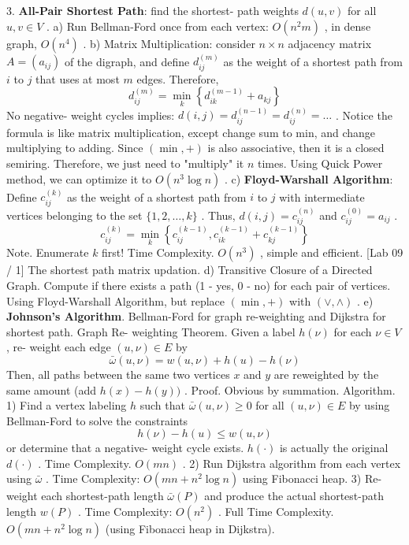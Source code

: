 \documentclass[10pt,a4paper]{article}
\begin{document}
3. \textbf{All-Pair Shortest Path}: find the shortest- path weights \(d(u,v)\) for all \(u,v\in V\) .
a) Run Bellman-Ford once from each vertex: \(O(n^{2}m)\) , in dense graph, \(O(n^{4})\) .
b) Matrix Multiplication: consider \(n\times n\) adjacency matrix \(A = (a_{ij})\) of the digraph, and define \(d_{ij}^{(m)}\) as the weight of a shortest path from \(i\) to \(j\) that uses at most \(m\) edges. Therefore,
\[
d_{ij}^{(m)} = \min_k\left\{d_{ik}^{(m - 1)} + a_{kj}\right\}
\]
No negative- weight cycles implies: \(d(i,j) = d_{ij}^{(n - 1)} = d_{ij}^{(n)} = \dots\) .
Notice the formula is like matrix multiplication, except change sum to min, and change multiplying to adding. Since \((\min, +)\) is also associative, then it is a closed semiring. Therefore, we just need to "multiply" it \(n\) times. Using Quick Power method, we can optimize it to \(O(n^{3}\log n)\) .
c) \textbf{Floyd-Warshall Algorithm}: Define \(c_{ij}^{(k)}\) as the weight of a shortest path from \(i\) to \(j\) with intermediate vertices belonging to the set \(\{1,2,\ldots ,k\}\) . Thus, \(d(i,j) = c_{ij}^{(n)}\) and \(c_{ij}^{(0)} = a_{ij}\) .
\[
c_{ij}^{(k)} = \min_k\left\{c_{ij}^{(k - 1)},c_{ik}^{(k - 1)} + c_{kj}^{(k - 1)}\right\}
\]
Note. Enumerate \(k\) first!
Time Complexity. \(O(n^3)\) , simple and efficient.
[Lab 09 / 1] The shortest path matrix updation.
d) Transitive Closure of a Directed Graph. Compute if there exists a path (1 - yes, 0 - no) for each pair of vertices. Using Floyd-Warshall Algorithm, but replace \((\min, +)\) with \((\lor, \land)\) .
e) \textbf{Johnson's Algorithm}. Bellman-Ford for graph re-weighting and Dijkstra for shortest path.
Graph Re- weighting Theorem. Given a label \(h(\nu)\) for each \(\nu \in V\) , re- weight each edge \((u,\nu)\in E\) by
\[
\bar{\omega} (u,\nu) = w(u,\nu) + h(u) - h(\nu)
\]
Then, all paths between the same two vertices \(x\) and \(y\) are reweighted by the same amount (add \(h(x) - h(y))\) .
Proof. Obvious by summation.
Algorithm.
1) Find a vertex labeling \(h\) such that \(\bar{\omega} (u,\nu)\geq 0\) for all \((u,\nu)\in E\) by using Bellman-Ford to solve the constraints
\[
h(\nu) - h(u)\leq w(u,\nu)
\]
or determine that a negative- weight cycle exists. \(h(\cdot)\) is actually the original \(d(\cdot)\) .
Time Complexity. \(O(mn)\) .
2) Run Dijkstra algorithm from each vertex using \(\bar{\omega}\) .
Time Complexity: \(O(mn + n^2\log n)\) using Fibonacci heap.
3) Re-weight each shortest-path length \(\bar{\omega} (P)\) and produce the actual shortest-path length \(w(P)\) .
Time Complexity: \(O(n^2)\) .
Full Time Complexity. \(O(mn + n^2\log n)\) (using Fibonacci heap in Dijkstra).
\end{document}
